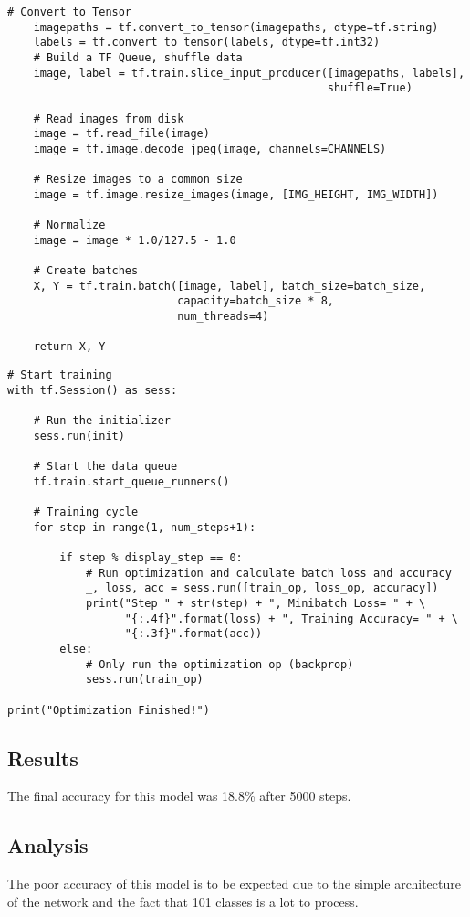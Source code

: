 \begin{lstlisting}[style=Python]
# Convert to Tensor
    imagepaths = tf.convert_to_tensor(imagepaths, dtype=tf.string)
    labels = tf.convert_to_tensor(labels, dtype=tf.int32)
    # Build a TF Queue, shuffle data
    image, label = tf.train.slice_input_producer([imagepaths, labels],
                                                 shuffle=True)

    # Read images from disk
    image = tf.read_file(image)
    image = tf.image.decode_jpeg(image, channels=CHANNELS)

    # Resize images to a common size
    image = tf.image.resize_images(image, [IMG_HEIGHT, IMG_WIDTH])

    # Normalize
    image = image * 1.0/127.5 - 1.0

    # Create batches
    X, Y = tf.train.batch([image, label], batch_size=batch_size,
                          capacity=batch_size * 8,
                          num_threads=4)

    return X, Y

\end{lstlisting}

\begin{lstlisting}[style=Python]
# Start training
with tf.Session() as sess:

    # Run the initializer
    sess.run(init)

    # Start the data queue
    tf.train.start_queue_runners()

    # Training cycle
    for step in range(1, num_steps+1):

        if step % display_step == 0:
            # Run optimization and calculate batch loss and accuracy
            _, loss, acc = sess.run([train_op, loss_op, accuracy])
            print("Step " + str(step) + ", Minibatch Loss= " + \
                  "{:.4f}".format(loss) + ", Training Accuracy= " + \
                  "{:.3f}".format(acc))
        else:
            # Only run the optimization op (backprop)
            sess.run(train_op)

print("Optimization Finished!")
\end{lstlisting}

\subsection*{Results}
The final accuracy for this model was 18.8\% after 5000 steps.

\subsection*{Analysis}
The poor accuracy of this model is to be expected due to the simple architecture of the network and the fact that 101 classes is a lot to process.